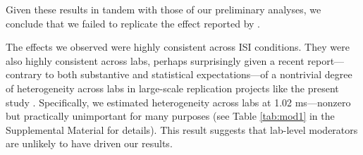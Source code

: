 \documentclass[man,floatsintext]{apa6}
\theoremstyle{definition}
\theoremstyle{definition}
\theoremstyle{definition}
\theoremstyle{remark}
\begin{document}
Given these results in tandem with those of our preliminary analyses, we
conclude that we failed to replicate the effect reported by
\textcite{Fischer:2003ju}.

The effects we observed were highly consistent across ISI conditions.
They were also highly consistent across labs, perhaps surprisingly given
a recent report---contrary to both substantive and statistical
expectations---of a nontrivial degree of heterogeneity across labs in
large-scale replication projects like the present study
\autocite{mcshane2019b}. Specifically, we estimated heterogeneity across
labs at 1.02 ms---nonzero but practically unimportant for many purposes
(see Table \ref{tab:mod1} in the Supplemental Material for details).
This result suggests that lab-level moderators are unlikely to have
driven our results.
\end{document}
